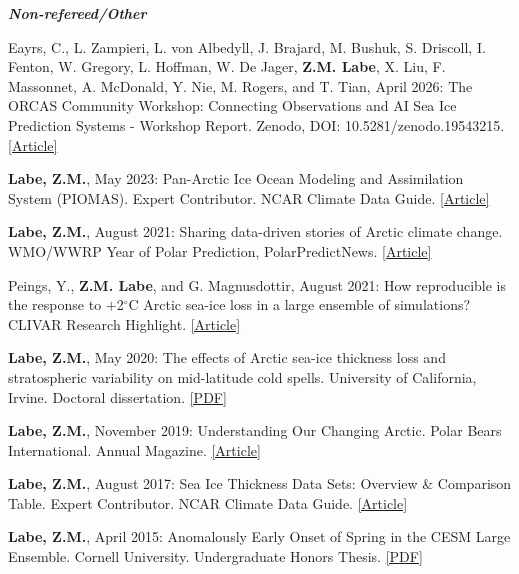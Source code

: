 \documentclass[margin,line,palatino,courier,10pt]{res}
\begin{document}
\begin{resume}
\textit{\textbf{Non-refereed/Other}}
\vspace*{-0.1in}\\
\begin{etaremune}[leftmargin=0in,topsep=0in,parsep=0in]
\item Eayrs, C., L. Zampieri, L. von Albedyll, J. Brajard, M. Bushuk, S. Driscoll, I. Fenton, W. Gregory, L. Hoffman, W. De Jager, \textbf{Z.M. Labe}, X. Liu, F. Massonnet, A. McDonald, Y. Nie, M. Rogers, and T. Tian, April 2026: The ORCAS Community Workshop: Connecting Observations and AI Sea Ice Prediction Systems - Workshop Report. Zenodo, DOI: 10.5281/zenodo.19543215. \href{https://doi.org/10.5281/zenodo.19543215}{[Article]}
\item \textbf{Labe, Z.M.}, May 2023: Pan-Arctic Ice Ocean Modeling and Assimilation System (PIOMAS). Expert Contributor. NCAR Climate Data Guide. \href{https://climatedataguide.ucar.edu/climate-data/pan-arctic-ice-ocean-modeling-and-assimilation-system-piomas}{[Article]}
\item \textbf{Labe, Z.M.}, August 2021: Sharing data-driven stories of Arctic climate change. WMO/WWRP Year of Polar Prediction, PolarPredictNews. \href{https://www.polarprediction.net/fileadmin/user_upload/www.polarprediction.net/Home/News/PolarPredictNews/PolarPredictNews_18_screen.pdf}{[Article]}
\item Peings, Y., \textbf{Z.M. Labe}, and G. Magnusdottir, August 2021: How reproducible is the response to $+$2$^{\circ}$C Arctic sea-ice loss in a large ensemble of simulations? CLIVAR Research Highlight. \href{https://usclivar.org/research-highlights/how-reproducible-response-2degc-arctic-sea-ice-loss-large-ensemble-simulations}{[Article]}
\item \textbf{Labe, Z.M.}, May 2020: The effects of Arctic sea-ice thickness loss and stratospheric variability on mid-latitude cold spells. University of California, Irvine. Doctoral dissertation. \href{https://escholarship.org/uc/item/778982rr}{[PDF]}
\item \textbf{Labe, Z.M.}, November 2019: Understanding Our Changing Arctic. Polar Bears International. Annual Magazine. \href{https://assets.ctfassets.net/i04syw39vv9p/4fPb2dw3vlHMbiLWsUPObz/baaa11beacec0f3b70297cfd33639ad7/pbi_2019_newsmag_web.pdf}{[Article]}
\item \textbf{Labe, Z.M.}, August 2017: Sea Ice Thickness Data Sets: Overview \& Comparison Table. Expert Contributor. NCAR Climate Data Guide. \href{https://climatedataguide.ucar.edu/climate-data/sea-ice-thickness-data-sets-overview-comparison-table}{[Article]}
\item \textbf{Labe, Z.M.}, April 2015: Anomalously Early Onset of Spring in the CESM Large Ensemble. Cornell University. Undergraduate Honors Thesis. \href{https://zacklabe.files.wordpress.com/2022/08/d1f36-labe_thesis2015.pdf}{[PDF]}
\end{etaremune}


\end{resume}
\end{document}
